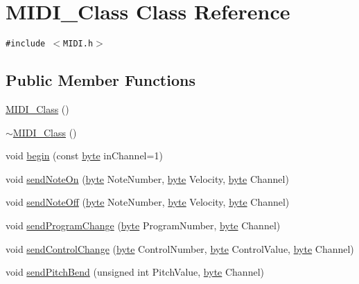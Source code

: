 \hypertarget{class_m_i_d_i___class}{
\section{MIDI\_\-Class Class Reference}
\label{class_m_i_d_i___class}
}
{\tt \#include $<$MIDI.h$>$}

\subsection*{Public Member Functions}
\begin{CompactItemize}
\item 
\hyperlink{class_m_i_d_i___class_5e395e8f748ec53a0818bffd0e2f176f}{MIDI\_\-Class} ()
\item 
\hyperlink{class_m_i_d_i___class_cea4c4db7092ba5cb7c147a3fb215e07}{$\sim$MIDI\_\-Class} ()
\item 
void \hyperlink{class_m_i_d_i___class_c34d163205bb01ac5e03df7e64facebe}{begin} (const \hyperlink{_m_i_d_i_8h_b8ef12fab634c171394422d0ee8baf94}{byte} inChannel=1)
\item 
void \hyperlink{class_m_i_d_i___class_9664e523b35d8b42749e7bc3ba888943}{sendNoteOn} (\hyperlink{_m_i_d_i_8h_b8ef12fab634c171394422d0ee8baf94}{byte} NoteNumber, \hyperlink{_m_i_d_i_8h_b8ef12fab634c171394422d0ee8baf94}{byte} Velocity, \hyperlink{_m_i_d_i_8h_b8ef12fab634c171394422d0ee8baf94}{byte} Channel)
\item 
void \hyperlink{class_m_i_d_i___class_381e1e8019aae5f872279cda496f964c}{sendNoteOff} (\hyperlink{_m_i_d_i_8h_b8ef12fab634c171394422d0ee8baf94}{byte} NoteNumber, \hyperlink{_m_i_d_i_8h_b8ef12fab634c171394422d0ee8baf94}{byte} Velocity, \hyperlink{_m_i_d_i_8h_b8ef12fab634c171394422d0ee8baf94}{byte} Channel)
\item 
void \hyperlink{class_m_i_d_i___class_803c2652837c09775d115354672bf69d}{sendProgramChange} (\hyperlink{_m_i_d_i_8h_b8ef12fab634c171394422d0ee8baf94}{byte} ProgramNumber, \hyperlink{_m_i_d_i_8h_b8ef12fab634c171394422d0ee8baf94}{byte} Channel)
\item 
void \hyperlink{class_m_i_d_i___class_3a80e9bd2cfdb619be91d80e8f3b7825}{sendControlChange} (\hyperlink{_m_i_d_i_8h_b8ef12fab634c171394422d0ee8baf94}{byte} ControlNumber, \hyperlink{_m_i_d_i_8h_b8ef12fab634c171394422d0ee8baf94}{byte} ControlValue, \hyperlink{_m_i_d_i_8h_b8ef12fab634c171394422d0ee8baf94}{byte} Channel)
\item 
void \hyperlink{class_m_i_d_i___class_45dcd73e3b8a107334e687750514f8b5}{sendPitchBend} (unsigned int PitchValue, \hyperlink{_m_i_d_i_8h_b8ef12fab634c171394422d0ee8baf94}{byte} Channel)

\end{CompactItemize}
